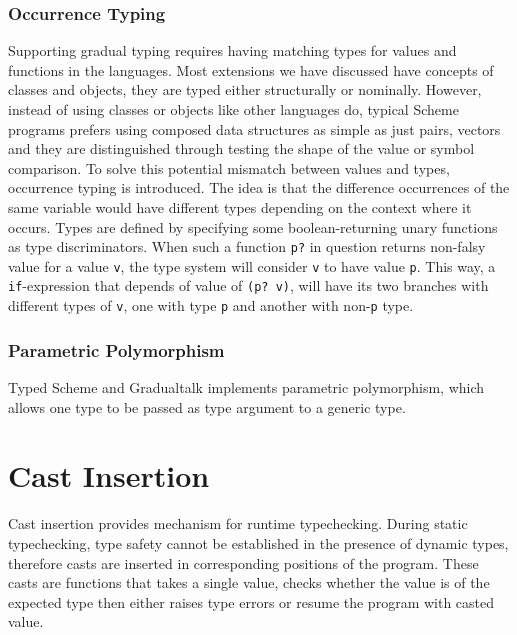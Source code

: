 \subsubsection{Occurrence Typing}


Supporting gradual typing requires having matching types for values and functions in the languages.
Most extensions we have discussed have concepts of classes and objects, they are typed either
structurally or nominally.
However, instead of using classes or objects like other languages do,
typical Scheme programs prefers using composed data structures as simple as just pairs, vectors
and they are distinguished through testing the shape of the value or symbol comparison.
To solve this potential mismatch between values and types, occurrence typing is introduced.
The idea is that the difference occurrences of the same variable would have different types
depending on the context where it occurs.
Types are defined by specifying some boolean-returning unary functions as type discriminators.
When such a function \texttt{p?} in question returns non-falsy value for a value \texttt{v},
the type system will consider \texttt{v} to have value \texttt{p}.
This way, a \texttt{if}-expression that depends of value of \texttt{(p? v)},
will have its two branches with different types of \texttt{v}, one with type \texttt{p}
and another with non-\texttt{p} type.

\subsubsection{Parametric Polymorphism}

Typed Scheme and Gradualtalk implements parametric polymorphism, which allows
one type to be passed as type argument to a generic type.

\section{Cast Insertion}

Cast insertion provides mechanism for runtime typechecking.
During static typechecking, type safety cannot be established in the presence of dynamic types,
therefore casts are inserted in corresponding positions of the program. These casts are functions
that takes a single value, checks whether the value is of the expected type then either
raises type errors or resume the program with casted value.

